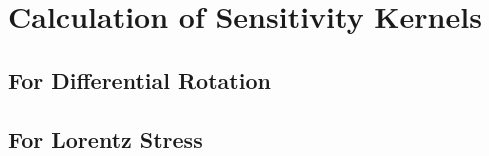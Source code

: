 
\chapter{Calculation of Sensitivity Kernels} 

\section{For Differential Rotation}


\section{For Lorentz Stress}
